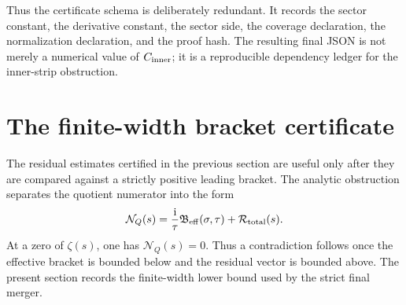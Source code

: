 \documentclass[11pt]{article}
\newcommand{\ii}{\mathrm{i}}
\newcommand{\sig}{\sigma}
\newcommand{\tauh}{\tau}
\newcommand{\NQ}{\mathcal N_Q}
\newcommand{\Beff}{\mathfrak B_{\rm eff}}
\newcommand{\Rtot}{\mathcal R_{\rm total}}
\newcommand{\Cinner}{C_{\rm inner}}
\begin{document}
Thus the certificate schema is deliberately redundant.  It records the sector
constant, the derivative constant, the sector side, the coverage declaration,
the normalization declaration, and the proof hash.  The resulting final JSON is
not merely a numerical value of \(\Cinner\); it is a reproducible dependency
ledger for the inner-strip obstruction.



\section{The finite-width bracket certificate}

The residual estimates certified in the previous section are useful only after
they are compared against a strictly positive leading bracket.  The analytic
obstruction separates the quotient numerator into the form
\[
        \NQ(s)
        =
        \frac{\ii}{\tauh}\Beff(\sig,\tauh)
        +
        \Rtot(s).
\]
At a zero of \(\zeta(s)\), one has \(\NQ(s)=0\).  Thus a contradiction follows
once the effective bracket is bounded below and the residual vector is bounded
above.  The present section records the finite-width lower bound used by the
strict final merger.
\end{document}
